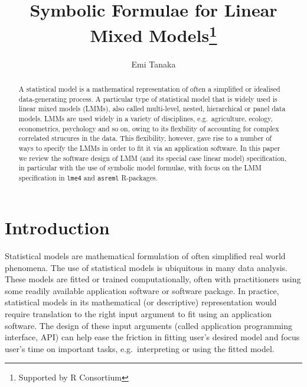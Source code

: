 \documentclass[runningheads]{llncs}
\title{Symbolic Formulae for Linear Mixed Models\thanks{Supported by R Consortium}}
\author{Emi Tanaka\inst{1}}
\institute{The University of Sydney, Camperdown NSW 2008, Australia\\\email{\href{mailto:dr.emi.tanaka@gmail.com}{\nolinkurl{dr.emi.tanaka@gmail.com}}}\\}
\begin{document}
%
\maketitle              %
%
\begin{abstract}
A statistical model is a mathematical representation of often a simplified or idealised data-generating process. A particular type of statistical model that is widely used is linear mixed models (LMMs), also called multi-level, nested, hierarchical or panel data models. LMMs are used widely in a variety of disciplines, e.g.~agriculture, ecology, econometrics, psychology and so on, owing to its flexbility of accounting for complex correlated strucures in the data. This flexibility, however, gave rise to a number of ways to specify the LMMs in order to fit it via an application software. In this paper we review the software design of LMM (and its special case linear model) specification, in particular with the use of symbolic model formulae, with focus on the LMM specification in \texttt{lme4} and \texttt{asreml} R-packages.
\end{abstract}

\hypertarget{introduction}{%
\section{Introduction}\label{introduction}}

Statistical models are mathematical formulation of often simplified real world phenomena. The use of statistical models is ubiquitous in many data analysis. These models are fitted or trained computationally, often with practitioners using some readily available application software or software package. In practice, statistical models in its mathematical (or descriptive) representation would require translation to the right input argument to fit using an application software. The design of these input arguments (called application programming interface, API) can help ease the friction in fitting user's desired model and focus user's time on important tasks, e.g.~interpreting or using the fitted model.
\end{document}
